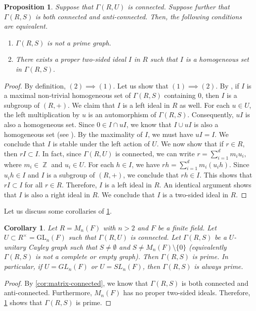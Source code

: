 \documentclass[12pt, a4paper]{amsart}
\newtheorem{prop}[thm]{Proposition}
\newtheorem{cor}[thm]{Corollary}
\theoremstyle{definition}
\DeclareMathOperator{\Z}{\mathbb{Z}}
\numberwithin{equation}{section}
\begin{document}
\begin{prop} \label{prop:homogeneous_ideal}
Suppose that $\Gamma(R,U)$ is connected. Suppose further that $\Gamma(R,S)$ is both connected and anti-connected. Then, the following conditions are equivalent. 
\begin{enumerate}
    \item $\Gamma(R,S)$ is not a prime graph. 
    \item There exists a proper two-sided ideal $I$ in $R$ such that $I$ is a homogeneous set in $\Gamma(R,S).$
\end{enumerate}
\end{prop}
\begin{proof}
By definition, $(2) \implies (1).$ Let us show that $(1) \implies (2).$ By \cite[Theorem 3.4]{chudnovsky2024prime}, if $I$ is a maximal non-trivial homogeneous set of $\Gamma(R,S)$ containing $0$, then $I$ is a subgroup of $(R, +).$  We claim that $I$ is a left ideal in $R$ as well. For each $u \in U$,  the left multiplication by $u$ is an automorphism of $\Gamma(R,S).$ Consequently, $uI$ is also a homogeneous set. Since $0 \in I \cap uI$, we know that  $I \cup uI$ is also a homogeneous set (see \cite[Lemma 3.1]{chudnovsky2024prime}). By the maximality of $I$, we must have $uI=I$. We conclude that $I$ is stable under the left action of $U.$ We now show that if $r \in R$, then $rI \subset I$. In fact, since $\Gamma(R,U)$ is connected, we can write
$r = \sum_{i=1}^d m_i u_i,$ where $m_i \in \Z$ and $u_i \in U.$ For each $h \in I$, we have  $rh = \sum_{i=1}^d m_i (u_i h).$
 Since $u_i h \in I$ and $I$ is a subgroup of $(R, +)$, we conclude that $rh \in I.$ This shows that $rI \subset I$ for all $r \in R$. Therefore, $I$ is a left ideal in $R$. An identical argument shows that $I$ is also a right ideal in $R.$ We conclude that $I$ is a two-sided ideal in $R.$
\end{proof}
Let us discuss some corollaries of \cref{prop:homogeneous_ideal}.
\begin{cor}
    Let $R=M_n(F)$ with $n>2$ and $F$ be a finite field. Let $U \subset R^{\times} = \text{GL}_n(F)$ such that $\Gamma(R, U)$ is connected. Let $\Gamma(R,S)$ be a $U$-unitary Cayley graph such that $S \neq \emptyset$ and $S \neq M_n(F) \setminus \{0\}$ (equivalently $\Gamma(R,S)$ is not a complete or empty graph). Then $\Gamma(R,S)$ is prime. In particular, if $U=GL_n(F)$ or $U=SL_n(F)$, then $\Gamma(R,S)$ is always prime. 
\end{cor}

\begin{proof}
    By \cref{cor:matrix-connected}, we know that $\Gamma(R,S)$ is both connected and anti-connected. Furthermore, $M_n(F)$ has no proper two-sided ideals. Therefore, \cref{prop:homogeneous_ideal} shows that $\Gamma(R,S)$ is prime. 
\end{proof}
\end{document}

